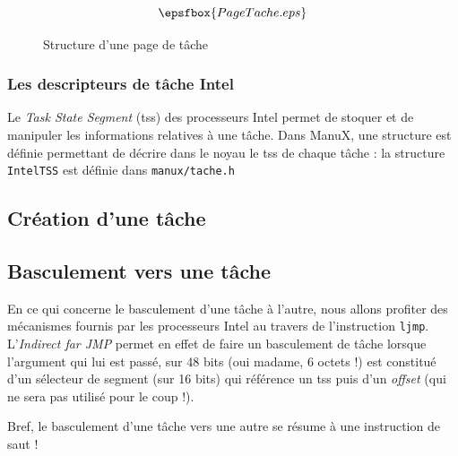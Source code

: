 \documentclass{book}
\begin{document}
\begin{figure}[htbp]
\epsfxsize=5cm
$$
\epsfbox{PageTache.eps}
$$
\caption{\label{Figure:PageTache}Structure d'une page de tâche}
\end{figure} 

%
\subsubsection{Les descripteurs de tâche Intel}

   Le {\em Task State Segment} ({\sc tss}) des processeurs Intel
permet de stoquer et de manipuler les informations relatives à une
tâche. Dans ManuX, une structure est définie permettant de décrire
dans le noyau le {\sc tss} de chaque tâche : la structure
\lstinline!IntelTSS! est définie dans
\lstinline!manux/tache.h!

\subsection{Création d'une tâche}

\subsection{Basculement vers une tâche}

   En ce qui concerne le basculement d'une tâche à l'autre, nous
allons profiter des mécanismes fournis par les processeurs Intel au
travers de l'instruction {\tt ljmp}. L'{\em Indirect far JMP} permet
en effet de faire un basculement de tâche lorsque l'argument qui lui
est passé, sur 48 bits (oui madame, 6 octets !) est constitué d'un
sélecteur de segment (sur 16 bits) qui référence un {\sc tss} puis
d'un {\em offset} (qui ne sera pas utilisé pour le coup !).

   Bref, le basculement d'une tâche vers une autre se résume à une
instruction de saut !

\end{document}
